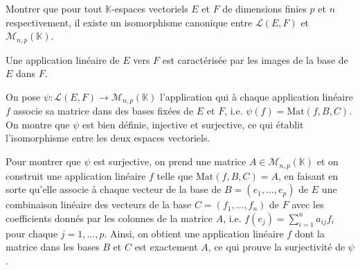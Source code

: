 \documentclass[11pt, a4paper]{article}
\theoremstyle{definition}
\begin{document}
\begin{tcolorbox}[instructionstyle]
	Montrer que pour tout $\mathbb K$-espaces vectoriels $E$ et $F$ de dimensions finies $p$ et $n$ respectivement, il existe un isomorphisme canonique entre $\mathcal L(E,F)$ et $\mathcal M_{n,p}(\mathbb K)$.
\end{tcolorbox}

\begin{rappel}
	Une application linéaire de $E$ vers $F$ est caractérisée par les images de la base de $E$ dans $F$.
\end{rappel}

\begin{tcolorbox}[methodstyle]
	On pose $\psi : \mathcal L(E,F) \to \mathcal M_{n,p}(\mathbb K)$ l'application qui à chaque application linéaire $f$ associe sa matrice dans des bases fixées de $E$ et $F$, i.e. $\psi(f) = \mathrm{Mat}(f,B,C)$. On montre que $\psi$ est bien définie, injective et surjective, ce qui établit l'isomorphisme entre les deux espaces vectoriels.
	
	Pour montrer que $\psi$ est surjective, on prend une matrice $A \in \mathcal M_{n,p}(\mathbb K)$ et on construit une application linéaire $f$ telle que $\mathrm{Mat}(f,B,C) = A$, en faisant en sorte qu'elle associe à chaque vecteur de la base de $B = (e_1, \dots, e_p)$ de $E$ une combinaison linéaire des vecteurs de la base $C = (f_1, \dots, f_n)$ de $F$ avec les coefficients donnés par les colonnes de la matrice $A$, i.e. $f(e_j) = \sum_{i=1}^{n} a_{ij} f_i$ pour chaque $j = 1, \dots, p$. Ainsi, on obtient une application linéaire $f$ dont la matrice dans les bases $B$ et $C$ est exactement $A$, ce qui prouve la surjectivité de $\psi$.
\end{tcolorbox}
\end{document}
